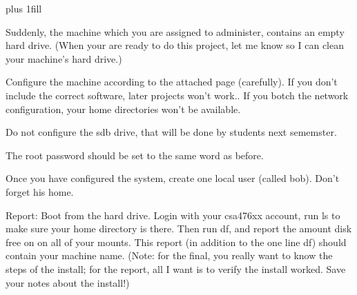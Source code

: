 
\rightskip=0pt plus 1fill

\parindent 0pt

Suddenly, the machine which you are assigned to administer,
contains an empty hard drive.
(When your are ready to do this project,
let me know so I can clean your machine's hard drive.)

Configure the machine according to the attached page (carefully).
If you don't include the correct software, later projects won't work..
If you botch the network configuration, your home directories won't
be available.

Do not configure the {\ltt{}sdb} drive,
that will be done by students next sememster.

The root password should be set to the same word as before.

Once you have configured the system, create one local user (called bob).
Don't forget his home.

Report: Boot from the hard drive.
Login with your csa476xx account, 
run {\ltt{}ls} to make sure your home directory is there.
Then run {\ltt{}df}, and report the amount disk free on 
on all of your mounts.
This report (in addition to the one line df) should contain your machine name.
(Note: for the final, you really want to know the steps of the install;
for the report, all I want is to verify the install worked.
Save your notes about the install!)

\bye
